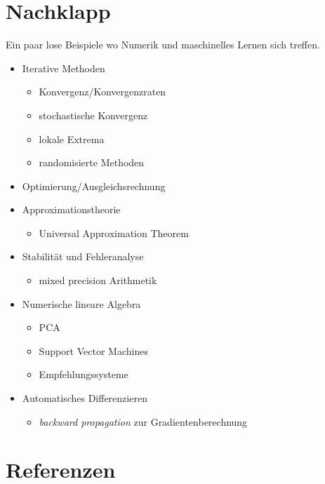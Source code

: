 \documentclass[
]{book}
\providecommand{\tightlist}{%
  \setlength{\itemsep}{0pt}\setlength{\parskip}{0pt}}
\theoremstyle{definition}
\theoremstyle{definition}
\theoremstyle{definition}
\theoremstyle{definition}
\theoremstyle{remark}
\begin{document}
\hypertarget{nachklapp}{%
\chapter{Nachklapp}\label{nachklapp}}

Ein paar lose Beispiele wo Numerik und maschinelles Lernen sich treffen.

\begin{itemize}
\item
  Iterative Methoden

  \begin{itemize}
  \tightlist
  \item
    Konvergenz/Konvergenzraten
  \item
    stochastische Konvergenz
  \item
    lokale Extrema
  \item
    randomisierte Methoden
  \end{itemize}
\item
  Optimierung/Ausgleichsrechnung
\item
  Approximationstheorie

  \begin{itemize}
  \tightlist
  \item
    Universal Approximation Theorem
  \end{itemize}
\item
  Stabilität und Fehleranalyse

  \begin{itemize}
  \tightlist
  \item
    mixed precision Arithmetik
  \end{itemize}
\item
  Numerische lineare Algebra

  \begin{itemize}
  \tightlist
  \item
    PCA
  \item
    Support Vector Machines
  \item
    Empfehlungssysteme
  \end{itemize}
\item
  Automatisches Differenzieren

  \begin{itemize}
  \tightlist
  \item
    \emph{backward propagation} zur Gradientenberechnung
  \end{itemize}
\end{itemize}

\hypertarget{referenzen}{%
\chapter*{Referenzen}\label{referenzen}}
\end{document}
